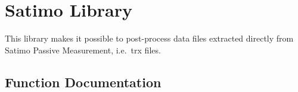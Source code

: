 \section{Satimo Library}
\label{sec:satimolib}

This library makes it possible to post-process data files extracted directly from Satimo Passive Measurement, i.e.\ trx files.

\subsection{Function Documentation}

